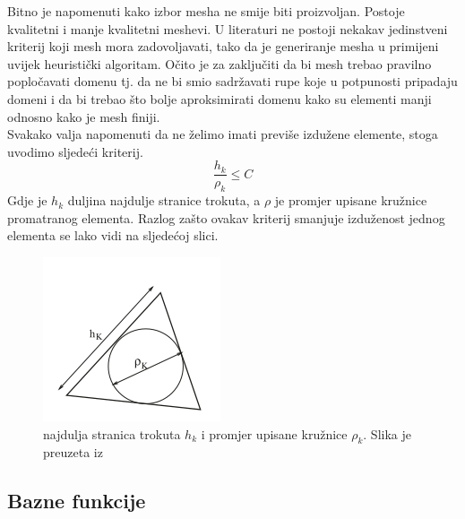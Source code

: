 \documentclass[zavrsnirad]{../fer}
\begin{document}
Bitno je napomenuti kako izbor mesha ne smije biti 
proizvoljan. Postoje kvalitetni i manje kvalitetni 
meshevi. U literaturi ne postoji nekakav jedinstveni 
kriterij koji mesh mora zadovoljavati, tako da 
je generiranje mesha u primijeni uvijek heuristički 
algoritam.
Očito je za zaključiti da bi mesh trebao pravilno popločavati
domenu tj. da ne bi smio sadržavati rupe koje u potpunosti
pripadaju domeni i da bi trebao što bolje aproksimirati domenu
kako su elementi manji odnosno kako je mesh finiji.
\bigskip
\\ 
Svakako valja napomenuti da ne želimo imati previše izdužene
elemente, stoga uvodimo sljedeći kriterij.
$$\frac{h_k}{\rho_k} \leq C$$
Gdje je $h_k$ duljina najdulje stranice trokuta, a 
$\rho$ je promjer upisane kružnice promatranog 
elementa. Razlog zašto ovakav kriterij smanjuje 
izduženost jednog elementa se lako vidi na sljedećoj
slici.
\begin{figure}[htb]
	\centering
	\includegraphics[width=0.38\linewidth]{Figures/element.png}
	\caption{najdulja stranica trokuta $h_k$ i promjer
  upisane kružnice $\rho_k$. Slika je preuzeta iz \cite{Quarteroni}}
\end{figure}

\newpage
\subsection{Bazne funkcije}
\end{document}
